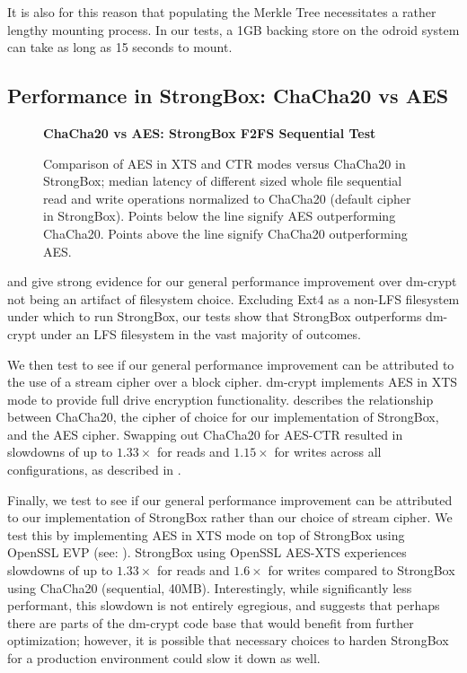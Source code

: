 It is also for this reason that populating the Merkle Tree necessitates a rather
lengthy mounting process. In our tests, a 1GB backing store on the odroid system
can take as long as 15 seconds to mount.

\subsection{Performance in StrongBox: ChaCha20 vs AES}
\begin{figure}[t]
    \textbf{ChaCha20 vs AES: StrongBox F2FS Sequential Test}\par\medskip
    \centering
    {}
    \caption{Comparison of AES in XTS and CTR modes versus ChaCha20 in
      StrongBox; median latency of different sized whole file
      sequential read and write operations normalized to ChaCha20
      (default cipher in StrongBox). Points below the line signify AES
      outperforming ChaCha20. Points above the line signify ChaCha20
      outperforming AES.}
   \label{fig:microbench-aes-vs-chacha}
\end{figure}
 and  give strong evidence for
our general performance improvement over dm-crypt not being an artifact of
filesystem choice. Excluding Ext4 as a non-LFS filesystem under which to run
StrongBox, our tests show that StrongBox outperforms dm-crypt under an LFS
filesystem in the vast majority of outcomes.

We then test to see if our general performance improvement can be attributed to
the use of a stream cipher over a block cipher. dm-crypt implements AES in XTS
mode to provide full drive encryption functionality.
 describes the relationship between ChaCha20,
the cipher of choice for our implementation of StrongBox, and the AES cipher.
Swapping out ChaCha20 for AES-CTR resulted in slowdowns of up to $1.33\times$
for reads and $1.15\times$ for writes across all configurations, as described in
.

Finally, we test to see if our general performance improvement can be attributed
to our implementation of StrongBox rather than our choice of stream cipher. We
test this by implementing AES in XTS mode on top of StrongBox using OpenSSL EVP
(see: ). StrongBox using OpenSSL AES-XTS
experiences slowdowns of up to $1.33\times$ for reads and $1.6\times$ for writes
compared to StrongBox using ChaCha20 (sequential, 40MB). Interestingly, while
significantly less performant, this slowdown is not entirely egregious, and
suggests that perhaps there are parts of the dm-crypt code base that would
benefit from further optimization; however, it is possible that necessary
choices to harden StrongBox for a production environment could slow it down as
well.

